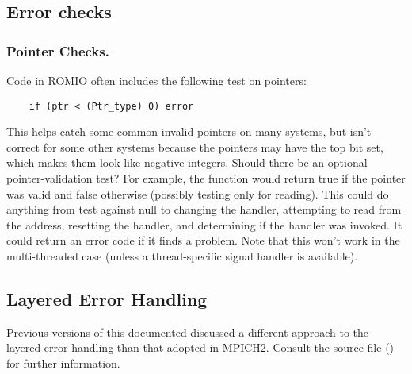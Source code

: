 \documentclass{article}
\begin{document}
\subsection{Error checks}

\subsubsection{Pointer Checks.}
Code in ROMIO often includes the following test on pointers:
\begin{verbatim}
    if (ptr < (Ptr_type) 0) error
\end{verbatim}
This helps catch some common invalid pointers on many systems, but isn't
correct for some other systems because the pointers may have the top
bit set, which makes them look like negative integers.  Should there
be an optional 
pointer-validation test?  For example, the function
 would return true if the pointer was valid and
false otherwise (possibly testing only for reading).  This could do anything
from test against null to changing the  handler, attempting to
read from the address, resetting the handler, and determining if the handler
was invoked.  It could return an error code if it finds a problem.
Note that this won't work in the multi-threaded case (unless a
thread-specific signal handler is available).



\subsection{Layered Error Handling}
Previous versions of this documented discussed a different approach to
the layered error handling than that adopted in MPICH2.  Consult the
source file () for further information.
\end{document}

